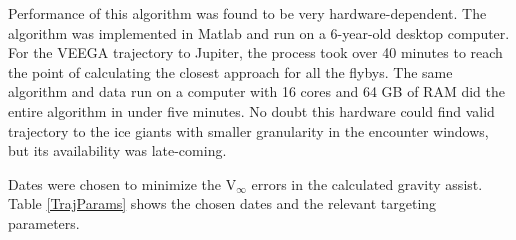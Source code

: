\documentclass[]{aiaa-tc}%
\begin{document}
	\vspace{5 mm}

	Performance of this algorithm was found to be very hardware-dependent. The algorithm was implemented in Matlab and run on a 6-year-old desktop computer. For the VEEGA trajectory to Jupiter, the process took over 40 minutes to reach the point of calculating the closest approach for all the flybys. The same algorithm and data run on a computer with 16 cores and 64 GB of RAM did the entire algorithm in under five minutes. No doubt this hardware could find valid trajectory to the ice giants with smaller granularity in the encounter windows, but its availability was late-coming.
	
	\vspace{5 mm}

Dates were chosen to minimize the V$_\infty$ errors in the calculated gravity assist. Table \ref{TrajParams} shows the chosen dates and the relevant targeting parameters.
\end{document}
